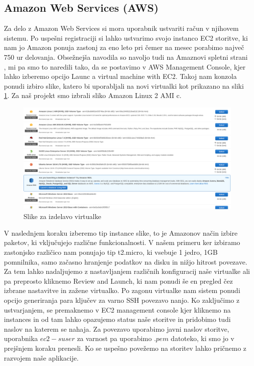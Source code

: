 \subsection{Amazon Web Services (AWS)}
Za delo z Amazon Web Services si mora uporabnik ustvariti račun v njihovem sistemu. Po uspešni registraciji si lahko ustvarimo svojo instanco EC2 storitve, ki nam jo Amazon ponuja zastonj za eno leto pri čemer na mesec porabimo največ 750 ur delovanja. Obsežnejša navodila so navoljo tudi na Amaznovi spletni strani \cite{1_aws_ec2_tutorial}, mi pa smo to naredili tako, da se postavimo v AWS Management Console, kjer lahko izberemo opcijo Launc a virtual machine with EC2. Takoj nam konzola ponudi izbiro slike, katero bi uporabljali na novi virtualki kot prikazano na sliki \ref{fig:1_AWS_images}. Za naš projekt smo izbrali sliko Amazon Linux 2 AMI c. 
\begin{figure}[H]
    \centering
    \includegraphics[scale=0.25]{Img/1_AWS_images.png}
    \caption{Slike za izdelavo virtualke}
    \label{fig:1_AWS_images}
\end{figure}
V naslednjem koraku izberemo tip instance slike, to je Amazonov način izbire paketov, ki vključujejo različne funkcionalnosti. V našem primeru ker izbiramo zastonjsko različico nam ponujajo tip t2.micro, ki vsebuje 1 jedro, 1GB pomnilnika, samo začasno hranjenje podatkov na disku in nižjo hitrost povezave. Za tem lahko nadaljujemo z nastavljanjem različnih konfiguracij naše virtualke ali pa preprosto kliknemo Review and Launch, ki nam ponudi še en pregled čez izbrane nastavitve in zažene virtualko.  Po zagonu virtualke nam sistem ponudi opcijo generiranja para ključev za varno SSH povezavo nanjo. Ko zaključimo z ustvarjanjem, se premaknemo v EC2 management console kjer kliknemo na instances in od tam lahko opazujemo status naše storitve in pridobimo tudi naslov na katerem se nahaja. Za povezavo uporabimo javni naslov storitve, uporabnika $ec2-suser$ za varnost pa uporabimo $.pem$ datoteko, ki smo jo v prejšnjem koraku prenesli. Ko se uspešno povežemo na storitev lahko pričnemo z razvojem naše aplikacije.

